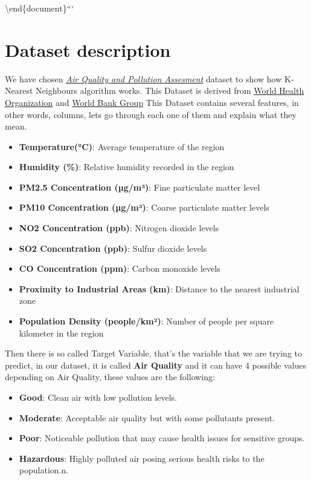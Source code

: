 \documentclass[
  letterpaper,
  DIV=11,
  numbers=noendperiod]{scrartcl}
\providecommand{\tightlist}{%
  \setlength{\itemsep}{0pt}\setlength{\parskip}{0pt}}\usepackage{longtable,booktabs,array}
\begin{document}
\textbackslash end\{document\}```

\section{Dataset description}\label{dataset-description}

We have chosen
\href{https://www.kaggle.com/datasets/mujtabamatin/air-quality-and-pollution-assessment/data}{\emph{Air
Quality and Pollution Assesment}} dataset to show how K-Nearest
Neighbours algorithm works. This Dataset is derived from
\href{https://www.who.int/health-topics/air-pollution\#tab=tab_1}{World
Health Organization} and
\href{https://data.worldbank.org/indicator/EN.POP.DNST}{World Bank
Group} This Dataset contains several features, in other words, columns,
lets go through each one of them and explain what they mean.

\begin{itemize}
\tightlist
\item
  \textbf{Temperature(°C)}: Average temperature of the region
\item
  \textbf{Humidity (\%)}: Relative humidity recorded in the region
\item
  \textbf{PM2.5 Concentration (µg/m³)}: Fine particulate matter level
\item
  \textbf{PM10 Concentration (µg/m³)}: Coarse particulate matter levels
\item
  \textbf{NO2 Concentration (ppb)}: Nitrogen dioxide levels
\item
  \textbf{SO2 Concentration (ppb)}: Sulfur dioxide levels
\item
  \textbf{CO Concentration (ppm)}: Carbon monoxide levels
\item
  \textbf{Proximity to Industrial Areas (km)}: Distance to the nearest
  industrial zone
\item
  \textbf{Population Density (people/km²)}: Number of people per square
  kilometer in the region
\end{itemize}

Then there is so called Target Variable, that's the variable that we are
trying to predict, in our dataset, it is called \textbf{Air Quality} and
it can have 4 possible values depending on Air Quality, these values are
the following:

\begin{itemize}
\tightlist
\item
  \textbf{Good}: Clean air with low pollution levels.
\item
  \textbf{Moderate}: Acceptable air quality but with some pollutants
  present.
\item
  \textbf{Poor}: Noticeable pollution that may cause health issues for
  sensitive groups.
\item
  \textbf{Hazardous}: Highly polluted air posing serious health risks to
  the population.n.
\end{itemize}
\end{document}
